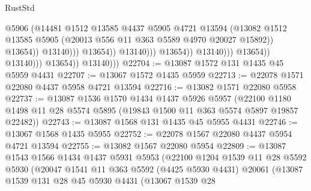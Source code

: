 \begin{lexlean}{RustStd}
\begin{coremodule}
                                                    @5906
                                                    (@14481
                                                      @1512
                                                      @13585
                                                      @4437
                                                      @5905
                                                      @4721
                                                      @13594
                                                      (@13082
                                                        @1512
                                                        @13585
                                                        @5905
                                                        (@20013
                                                          @556
                                                          @11
                                                          @363
                                                          @5589
                                                          @4970
                                                          @20027
                                                          @15892))
                                                      @13654))
                                                  @13140)))
                                            @13654))
                                        @13140)))
                                  @13654))
                              @13140)))
                        @13654))
                    @13140)))
              @13654))
          @13140)))
@22704 := @13087 @1572 @131 @1435 @45 @5959 @4431
@22707 := @13067 @1572 @1435 @5959
@22713 := @22078 @1571 @22080 @4437 @5958 @4721 @13594
@22716 := @13082 @1571 @22080 @5958
@22737 := @13087
    @1536
    @1570
    @1434
    @1437
    @5926
    @5957
    (@22100 @1180 @1498 @11 @28 @5574 @5895 (@19843 @1500 @11 @363 @5574 @5897 @19857 @22482))
@22743 := @13087 @1568 @131 @1435 @45 @5955 @4431
@22746 := @13067 @1568 @1435 @5955
@22752 := @22078 @1567 @22080 @4437 @5954 @4721 @13594
@22755 := @13082 @1567 @22080 @5954
@22809 := @13087
    @1543
    @1566
    @1434
    @1437
    @5931
    @5953
    (@22100
      @1204
      @1539
      @11
      @28
      @5592
      @5930
      (@20047
        @1541
        @11
        @363
        @5592
        (@4425 @5930 @4431)
        @20061
        (@13087
          @1539
          @131
          @28
          @45
          @5930
          @4431
          (@13067
            @1539
            @28

\end{coremodule}
\end{lexlean}
